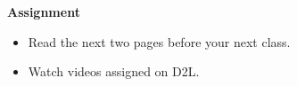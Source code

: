 \noindent
{\bf Assignment} \vspace{-.2in}
\begin{itemize}
\item Read the next two pages before your next class.
\item Watch videos assigned on D2L.
\end{itemize}
